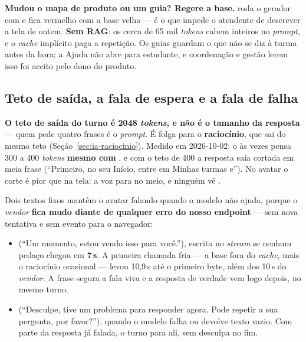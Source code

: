 \begin{regra}
\textbf{Mudou o mapa de produto ou um guia? Regere a base.}
 roda o gerador com  e fica
vermelho com a base velha --- é o que impede o atendente de descrever a tela de
ontem. \textbf{Sem RAG}: os cerca de 65 mil \emph{tokens} cabem inteiros no
\emph{prompt}, e o \emph{cache} implícito paga a repetição. Os guias guardam o que
não se diz à turma antes da hora; a Ajuda não abre para estudante, e
coordenação e gestão lerem isso foi aceito pelo dono do produto.
\end{regra}

\subsection{Teto de saída, a fala de espera e a fala de falha}

\begin{atencao}
\textbf{O teto de saída do turno é \num{2048} \emph{tokens}, e não é o tamanho da
resposta} --- quem pede quatro frases é o \emph{prompt}. É folga para o
\textbf{raciocínio}, que sai do mesmo teto (Seção~\ref{sec:ia-raciocinio}).
Medido em 2026-10-02: o  às vezes pensa 300 a 400
\emph{tokens} \textbf{mesmo com }, e com o teto de 400 a
resposta saía cortada em meia frase (\enquote{Primeiro, no seu Início, entre em
Minhas turmas e}). No avatar o corte é pior que na tela: a voz para no meio, e
ninguém vê .
\end{atencao}

Dois textos fixos mantêm o avatar falando quando o modelo não ajuda, porque o
\emph{vendor} \textbf{fica mudo diante de qualquer erro do nosso endpoint} ---
sem nova tentativa e sem evento para o navegador:

\begin{itemize}
  \item {} (\enquote{Um momento, estou vendo isso para
    você.}), escrita no \emph{stream} se nenhum pedaço chegou em
    \textbf{7\,s}. A primeira chamada fria --- a base fora do \emph{cache}, mais o
    raciocínio ocasional --- levou 10,9\,s até o primeiro byte, além dos 10\,s
    do \emph{vendor}. A frase segura a fala viva e a resposta de verdade vem
    logo depois, no mesmo turno.
  \item {} (\enquote{Desculpe, tive um problema para
    responder agora. Pode repetir a sua pergunta, por favor?}), quando o modelo
    falha ou devolve texto vazio. Com parte da resposta já falada, o turno para
    ali, sem desculpa no fim.
\end{itemize}

